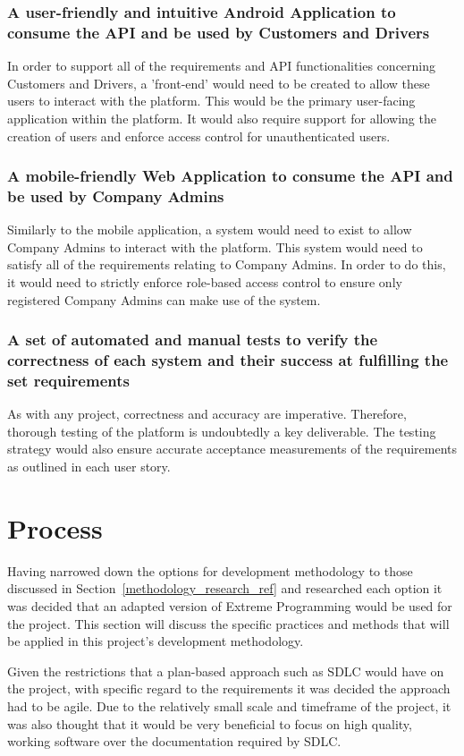 \subsubsection{A user-friendly and intuitive Android Application to consume the API and be used by Customers and Drivers}
In order to support all of the requirements and API functionalities concerning Customers and Drivers, a 'front-end' would need to be created to allow these users to interact with the platform. This would be the primary user-facing application within the platform. It would also require support for allowing the creation of users and enforce access control for unauthenticated users.

\subsubsection{A mobile-friendly Web Application to consume the API and be used by Company Admins}
Similarly to the mobile application, a system would need to exist to allow Company Admins to interact with the platform. This system would need to satisfy all of the requirements relating to Company Admins. In order to do this, it would need to strictly enforce role-based access control to ensure only registered Company Admins can make use of the system.

\subsubsection{A set of automated and manual tests to verify the correctness of each system and their success at fulfilling the set requirements}
As with any project, correctness and accuracy are imperative. Therefore, thorough testing of the platform is undoubtedly a key deliverable. The testing strategy would also ensure accurate acceptance measurements of the requirements as outlined in each user story.

\section{Process}\label{process_ref}
Having narrowed down the options for development methodology to those discussed in Section~\ref{methodology_research_ref} and researched each option it was decided that an adapted version of Extreme Programming would be used for the project. This section will discuss the specific practices and methods that will be applied in this project's development methodology.

Given the restrictions that a plan-based approach such as SDLC  would have on the project, with specific regard to the requirements it was decided the approach had to be agile. Due to the relatively small scale and timeframe of the project, it was also thought that it would be very beneficial to focus on high quality, working software over the documentation required by SDLC.

